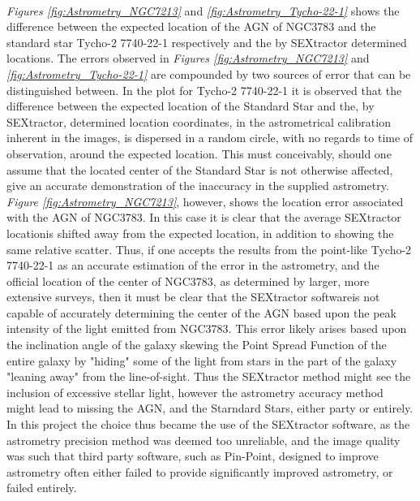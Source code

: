 \documentclass[a4paper, 12pt, twoside]{article}
\begin{document}
\\
\emph{Figures \ref{fig:Astrometry_NGC7213}} and \emph{\ref{fig:Astrometry_Tycho-22-1}} shows the difference between the expected location of the AGN of NGC3783 and the standard star Tycho-2 7740-22-1 respectively and the by SEXtractor determined locations. The errors observed in \emph{Figures \ref{fig:Astrometry_NGC7213}} and \emph{\ref{fig:Astrometry_Tycho-22-1}} are compounded by two sources of error that can be distinguished between. In the plot for Tycho-2 7740-22-1 it is observed that the difference between the expected location of the Standard Star and the, by SEXtractor, determined location coordinates, in the astrometrical calibration inherent in the images, is dispersed in a random circle, with no regards to time of observation, around the expected location. This must conceivably, should one assume that the located center of the Standard Star is not otherwise affected, give an accurate demonstration of the inaccuracy in the supplied astrometry. \emph{Figure \ref{fig:Astrometry_NGC7213}}, however, shows the location error associated with the AGN of NGC3783. In this case it is clear that the average SEXtractor locationis shifted away from the expected location, in addition to showing the same relative scatter. Thus, if one accepts the results from the point-like Tycho-2 7740-22-1 as an accurate estimation of the error in the astrometry, and the official location of the center of NGC3783, as determined by larger, more extensive surveys, then it must be clear that the SEXtractor softwareis not capable of accurately determining the center of the AGN based upon the peak intensity of the light emitted from NGC3783. This error likely arises based upon the inclination angle of the galaxy skewing the Point Spread Function of the entire galaxy by "hiding" some of the light from stars in the part of the galaxy "leaning away" from the line-of-sight. Thus the SEXtractor method might see the inclusion of excessive stellar light, however the astrometry accuracy method might lead to missing the AGN, and the Starndard Stars, either party or entirely. In this project the choice thus became the use of the SEXtractor software, as the astrometry precision method was deemed too unreliable, and the image quality was such that third party software, such as Pin-Point, designed to improve astrometry often either failed to provide significantly improved astrometry, or failed entirely. 
\end{document}
